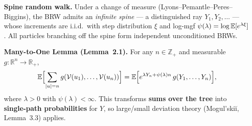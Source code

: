 \small
\textbf{Spine random walk.}
Under a change of measure (Lyons--Pemantle--Peres--Biggins), the BRW admits an \emph{infinite spine} --- a distinguished ray $Y_1,Y_2,\ldots$ --- whose increments are i.i.d.~with step distribution $\xi$ and log-mgf $\psi(\lambda)=\log\mathbb{E}[e^{\lambda\xi}]$. All particles branching off the spine form independent unconditioned BRWs.

\medskip
\textbf{Many-to-One Lemma (Lemma~2.1).}
For any $n\in\mathbb Z_+$ and measurable $g:\mathbb R^n\to\mathbb R_+$,
\[
    \mathbb E\Bigl[\sum_{|u|=n} g(\mathcal V(u_1),\ldots,\mathcal V(u_n))\Bigr]
    = \mathbb E\Bigl[e^{\lambda Y_n+\psi(\lambda)n}\,g(Y_1,\ldots,Y_n)\Bigr],
\]
where $\lambda>0$ with $\psi(\lambda)<\infty$. This transforms \textbf{sums over the tree} into \textbf{single-path probabilities} for $Y$, so large/small deviation theory (Mogul'ski\u{i}, Lemma~3.3) applies.
